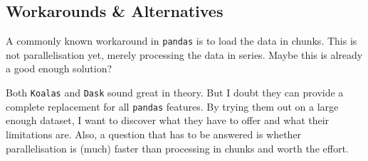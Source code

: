 \subsection{Workarounds \& Alternatives}

A commonly known workaround in \texttt{pandas} is to load the data in chunks. This is not parallelisation yet, merely processing the data in series. Maybe this is already a good enough solution?

Both \texttt{Koalas} and \texttt{Dask} sound great in theory. But I doubt they can provide a complete replacement for all \texttt{pandas} features. By trying them out on a large enough dataset, I want to discover what they have to offer and what their limitations are. Also, a question that has to be answered is whether parallelisation is (much) faster than processing in chunks and worth the effort.